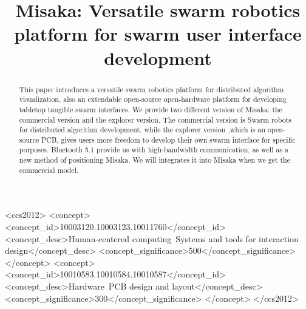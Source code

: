 \documentclass[sigconf]{acmart}
\begin{document}
\title{Misaka: Versatile swarm robotics platform for swarm user interface development}




\renewcommand{\shortauthors}{Tingliang and Haipeng}

\begin{abstract}
  This paper introduces a versatile swarm robotics platform for distributed algorithm visualization, also an extendable open-source open-hardware platform for developing tabletop tangible swarm interfaces. 
  We provide two different version of Misaka: the commercial version and the explorer version. The commercial version is Swarm robots for distributed algorithm development, while the explorer version ,which is an open-source PCB, gives users more freedom to develop their own swarm interface for specific porposes.
  Bluetooth 5.1 provide us with high-bandwidth communication, as well as a new method of positioning Misaka. We will integrates it into Misaka when we get the commercial model.


\end{abstract}

\begin{CCSXML}
  <ccs2012>
     <concept>
         <concept_id>10003120.10003123.10011760</concept_id>
         <concept_desc>Human-centered computing~Systems and tools for interaction design</concept_desc>
         <concept_significance>500</concept_significance>
         </concept>
     <concept>
         <concept_id>10010583.10010584.10010587</concept_id>
         <concept_desc>Hardware~PCB design and layout</concept_desc>
         <concept_significance>300</concept_significance>
         </concept>
   </ccs2012>
\end{CCSXML}
\end{document}
